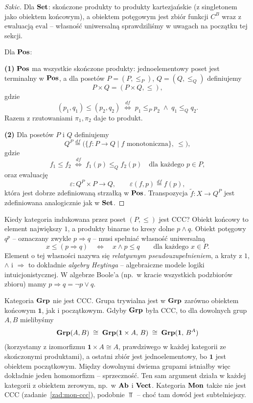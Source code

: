 \begin{proof}[Szkic]
Dla $\mathbf{Set}$: skończone produkty to produkty kartezjańskie (z singletonem jako obiektem końcowym), a obiektem potęgowym jest zbiór funkcji $C^B$ wraz z ewaluacją $\mathrm{eval}$ -- własność uniwersalną sprawdziliśmy w uwagach na początku tej sekcji.

Dla $\mathbf{Pos}$:

\textbf{(1)} $\mathbf{Pos}$ ma wszystkie skończone produkty: jednoelementowy poset jest terminalny w $\mathbf{Pos}$, a dla posetów $P = (P, \leq_P)$, $Q = (Q, \leq_Q)$ definiujemy
\[
P \times Q = (P \times Q, \leq),
\]
gdzie
\[
(p_1, q_1) \leq (p_2, q_2) \;\stackrel{df}{\iff}\; p_1 \leq_P p_2 \;\wedge\; q_1 \leq_Q q_2.
\]
Razem z rzutowaniami $\pi_1, \pi_2$ daje to produkt.

\textbf{(2)} Dla posetów $P$ i $Q$ definiujemy
\[
Q^P \stackrel{df}{=} \big(\{f : P \to Q \mid f \text{ monotoniczna}\},\ \leq\big),
\]
gdzie
\[
f_1 \leq f_2 \;\stackrel{df}{\iff}\; f_1(p) \leq_Q f_2(p) \quad \text{dla każdego } p \in P,
\]
oraz ewaluację
\[
\varepsilon : Q^P \times P \to Q, \qquad \varepsilon(f, p) \stackrel{df}{=} f(p),
\]
która jest dobrze zdefiniowaną strzałką w $\mathbf{Pos}$. Transpozycja $\tilde{f}\colon X\to Q^P$ jest zdefiniowana analogicznie jak w $\mathbf{Set}$.
\end{proof}

\begin{przyklad}
Kiedy kategoria indukowana przez poset $(P, \le)$ jest CCC? Obiekt końcowy to element największy $1$, a produkty binarne to kresy dolne $p \wedge q$. Obiekt potęgowy $q^p$ -- oznaczany zwykle $p \Rightarrow q$ -- musi spełniać własność uniwersalną
\[
x \le (p \Rightarrow q) \quad\Longleftrightarrow\quad x \wedge p \le q \qquad \text{dla każdego } x \in P.
\]
Element o tej własności nazywa się \emph{relatywnym pseudouzupełnieniem}, a kraty z $1$, $\wedge$ i $\Rightarrow$ to dokładnie \emph{algebry Heytinga} -- algebraiczne modele logiki intuicjonistycznej. W algebrze Boole'a (np.\ w kracie wszystkich podzbiorów zbioru) mamy $p \Rightarrow q = \neg p \vee q$.
\end{przyklad}

\begin{uwaga}
Kategoria $\mathbf{Grp}$ nie jest CCC. Grupa trywialna jest w $\mathbf{Grp}$ zarówno obiektem końcowym $\mathbf{1}$, jak i początkowym. Gdyby $\mathbf{Grp}$ była CCC, to dla dowolnych grup $A, B$ mielibyśmy
\[
\mathbf{Grp}(A, B) \;\cong\; \mathbf{Grp}(\mathbf{1}\times A,\, B) \;\cong\; \mathbf{Grp}(\mathbf{1},\, B^A)
\]
(korzystamy z izomorfizmu $\mathbf{1}\times A \cong A$, prawdziwego w każdej kategorii ze skończonymi produktami), a ostatni zbiór jest jednoelementowy, bo $\mathbf{1}$ jest obiektem początkowym. Między dowolnymi dwiema grupami istniałby więc dokładnie jeden homomorfizm -- sprzeczność. Ten sam argument działa w każdej kategorii z obiektem zerowym, np.\ w $\mathbf{Ab}$ i $\mathbf{Vect}$. Kategoria $\mathbf{Mon}$ także nie jest CCC (zadanie~\ref{zad:mon-ccc}), podobnie $\Top$ -- choć tam dowód jest subtelniejszy.
\end{uwaga}
